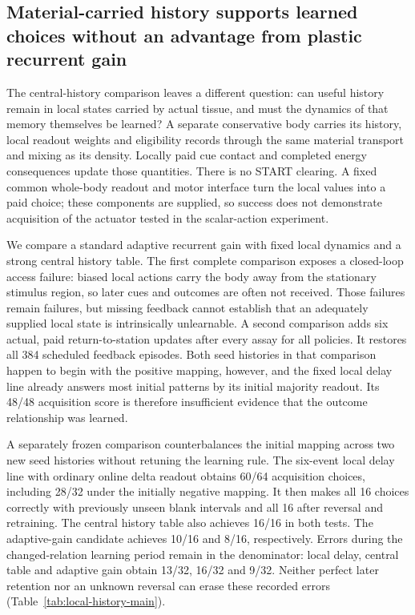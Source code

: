 \subsection*{Material-carried history supports learned choices without an advantage from plastic recurrent gain}

The central-history comparison leaves a different question: can useful history remain in local states carried by actual tissue, and must the dynamics of that memory themselves be learned? A separate conservative body carries its history, local readout weights and eligibility records through the same material transport and mixing as its density. Locally paid cue contact and completed energy consequences update those quantities. There is no START clearing. A fixed common whole-body readout and motor interface turn the local values into a paid choice; these components are supplied, so success does not demonstrate acquisition of the actuator tested in the scalar-action experiment.

We compare a standard adaptive recurrent gain with fixed local dynamics and a strong central history table. The first complete comparison exposes a closed-loop access failure: biased local actions carry the body away from the stationary stimulus region, so later cues and outcomes are often not received. Those failures remain failures, but missing feedback cannot establish that an adequately supplied local state is intrinsically unlearnable. A second comparison adds six actual, paid return-to-station updates after every assay for all policies. It restores all 384 scheduled feedback episodes. Both seed histories in that comparison happen to begin with the positive mapping, however, and the fixed local delay line already answers most initial patterns by its initial majority readout. Its 48/48 acquisition score is therefore insufficient evidence that the outcome relationship was learned.

A separately frozen comparison counterbalances the initial mapping across two new seed histories without retuning the learning rule. The six-event local delay line with ordinary online delta readout obtains 60/64 acquisition choices, including 28/32 under the initially negative mapping. It then makes all 16 choices correctly with previously unseen blank intervals and all 16 after reversal and retraining. The central history table also achieves 16/16 in both tests. The adaptive-gain candidate achieves 10/16 and 8/16, respectively. Errors during the changed-relation learning period remain in the denominator: local delay, central table and adaptive gain obtain 13/32, 16/32 and 9/32. Neither perfect later retention nor an unknown reversal can erase these recorded errors (Table~\ref{tab:local-history-main}).

